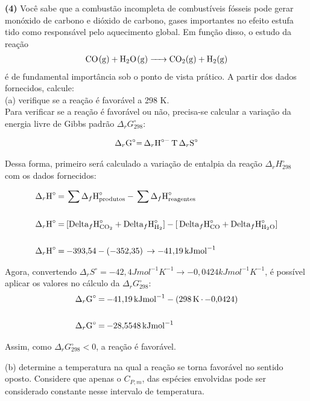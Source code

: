 \textbf{(4)} Você sabe que a combustão incompleta de combustíveis fósseis
pode gerar monóxido de carbono e dióxido de carbono, gases importantes no efeito
estufa tido como responsável pelo aquecimento global. Em função disso, o estudo
da reação
\begin{align*}
    \ce{CO(g) + H2O(g) -> CO2(g) + H2(g)}
\end{align*}
é de fundamental importância sob o ponto de vista prático. A partir dos dados fornecidos,
calcule:\\

(a) verifique se a reação é favorável a 298 K.\\

Para verificar se a reação é favorável ou não, precisa-se calcular a variação da energia livre de Gibbs padrão \( \Delta_rG^\circ_{298}\):

\begin{align*}
	\ce{\Delta_rG^\circ = \Delta_rH^\circ - T \Delta_rS^\circ}
\end{align*}

Dessa forma, primeiro será calculado a variação de entalpia da reação \( \Delta_rH^\circ_{298}\) com os dados fornecidos:

\begin{align*}
	\ce{\Delta_rH^\circ &= \sum\Delta_fH^\circ_{produtos} - \sum\Delta_fH^\circ_{reagentes}}\\ \\
	\ce{\Delta_rH^\circ &= [Delta_fH^\circ_{CO_2} + Delta_fH^\circ_{H_2}] - [ Delta_fH^\circ_{CO} + Delta_fH^\circ_{H_2O}]}\\ \\
	\ce{\Delta_rH^\circ &= -393,54 - (-352,35) \rightarrow -41,19kJmol^{-1}}
\end{align*}

Agora, convertendo \(\Delta_rS^\circ = -42,4Jmol^{-1}K^{-1} \rightarrow -0,0424kJ mol^{-1}K^{-1}\), é possível aplicar os valores no cálculo da \(\Delta_rG^\circ_{298}\):
\begin{align*}
	\ce{\Delta_rG^\circ &= -41,19kJmol^{-1} - (298K * -0,0424)} \\ \\
	\ce{\Delta_rG^\circ &= -28,5548kJmol^{-1}}
\end{align*}

Assim, como \(\Delta_rG^\circ_{298} < 0\), a reação é favorável.
 
(b) determine a temperatura na qual a reação se torna favorável no sentido 
oposto. Considere que apenas o \(C_{P,m}\), das espécies envolvidas pode ser
considerado constante nesse intervalo de temperatura.\\

